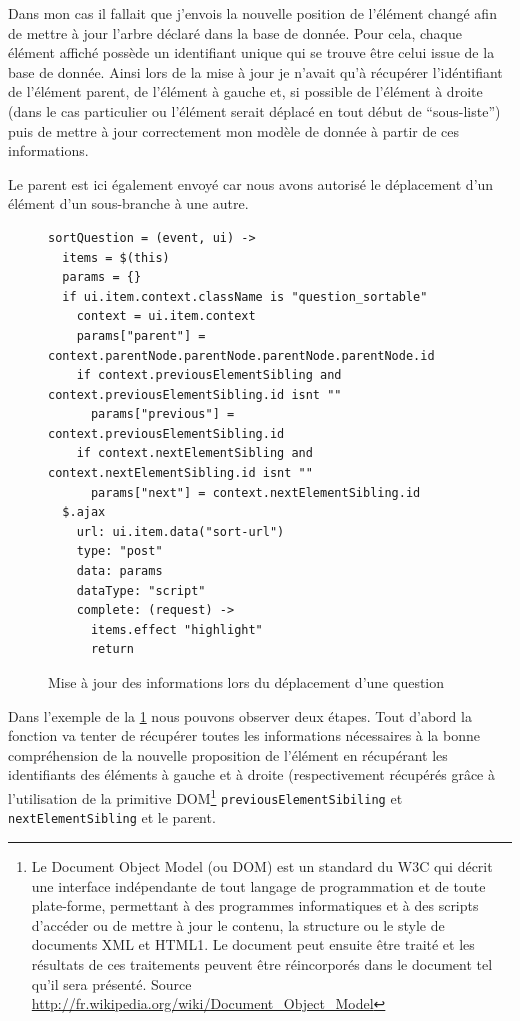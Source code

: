 \documentclass[12pt,a4paper]{book}
\begin{document}
Dans mon cas il fallait que j'envois la nouvelle position de l'élément changé afin de mettre à jour l'arbre déclaré dans la base de donnée. Pour cela, chaque élément affiché possède un identifiant unique qui se trouve être celui issue de la base de donnée. Ainsi lors de la mise à jour je n'avait qu'à récupérer l'idéntifiant de l'élément parent, de l'élément à gauche et, si possible de l'élément à droite (dans le cas particulier ou l'élément serait déplacé en tout début de ``sous-liste'') puis de mettre à jour correctement mon modèle de donnée à partir de ces informations.

Le parent est ici également envoyé car nous avons autorisé le déplacement d'un élément d'un sous-branche à une autre.

\begin{figure}[h]
\begin{lstlisting}
sortQuestion = (event, ui) ->
  items = $(this)
  params = {}
  if ui.item.context.className is "question_sortable"
    context = ui.item.context
    params["parent"] = context.parentNode.parentNode.parentNode.parentNode.id
    if context.previousElementSibling and context.previousElementSibling.id isnt ""
      params["previous"] = context.previousElementSibling.id
    if context.nextElementSibling and context.nextElementSibling.id isnt ""
      params["next"] = context.nextElementSibling.id 
  $.ajax
    url: ui.item.data("sort-url")
    type: "post"
    data: params
    dataType: "script"
    complete: (request) ->
      items.effect "highlight"
      return
\end{lstlisting}
 \caption{Mise à jour des informations lors du déplacement d'une question}
 \label{fig.sort2}
\end{figure}

Dans l'exemple de la \cref{fig.sort2} nous pouvons observer deux étapes. Tout d'abord la fonction va tenter de récupérer toutes les informations nécessaires à la bonne compréhension de la nouvelle proposition de l'élément en récupérant les identifiants des éléments à gauche et à droite (respectivement récupérés grâce à l'utilisation de la primitive DOM\footnote{Le Document Object Model (ou DOM) est un standard du W3C qui décrit une interface indépendante de tout langage de programmation et de toute plate-forme, permettant à des programmes informatiques et à des scripts d'accéder ou de mettre à jour le contenu, la structure ou le style de documents XML et HTML1. Le document peut ensuite être traité et les résultats de ces traitements peuvent être réincorporés dans le document tel qu'il sera présenté. Source \url{http://fr.wikipedia.org/wiki/Document_Object_Model}} \texttt{previousElementSibiling} et \texttt{nextElementSibling} et le parent.
\end{document}
